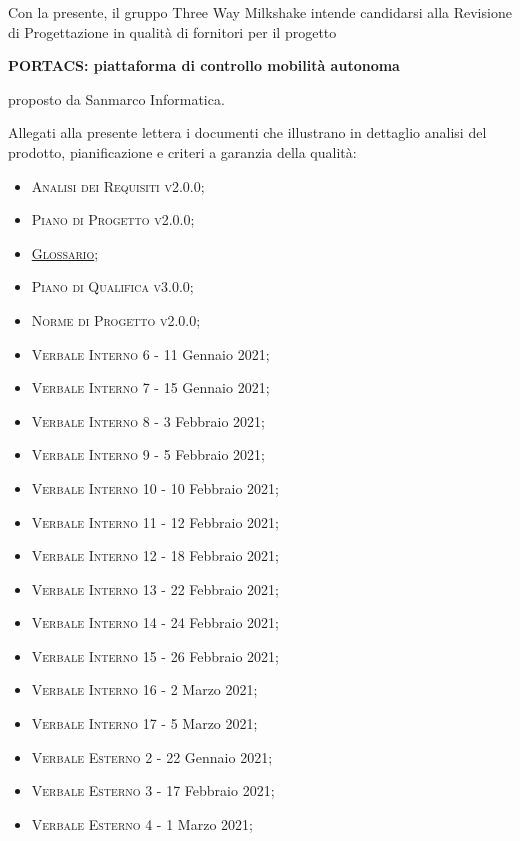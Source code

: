 \documentclass[10pt,stdletter,dateno,sigright]{newlfm}  %
\begin{document}
    \begin{newlfm}


        Con la presente, il gruppo Three Way Milkshake intende candidarsi alla Revisione di Progettazione in qualità di fornitori per il progetto
        \begin{center}
            \textbf{PORTACS: piattaforma di controllo mobilità autonoma}
        \end{center}
        proposto da Sanmarco Informatica.

        Allegati alla presente lettera i documenti che illustrano in dettaglio analisi del prodotto, pianificazione e criteri a garanzia della qualità:
	\begin{multicols}{2}
        \begin{itemize}
            \item \textsc{Analisi dei Requisiti v2.0.0;}
            \item \textsc{Piano di Progetto v2.0.0;}
            \item \textsc{\href{https://github.com/Three-Way-Milkshake/docs/wiki/Glossario}{Glossario};}
            \item \textsc{Piano di Qualifica v3.0.0;}
            \item \textsc{Norme di Progetto v2.0.0;}
            \item \textsc{Verbale Interno 6} - 11 Gennaio 2021;
            \item \textsc{Verbale Interno 7} - 15 Gennaio 2021;
            \item \textsc{Verbale Interno 8} - 3 Febbraio 2021;
            \item \textsc{Verbale Interno 9} - 5 Febbraio 2021;
            \item \textsc{Verbale Interno 10} - 10 Febbraio 2021;
            \item \textsc{Verbale Interno 11} - 12 Febbraio 2021;
            \item \textsc{Verbale Interno 12} - 18 Febbraio 2021;
            \item \textsc{Verbale Interno 13} - 22 Febbraio 2021;
            \item \textsc{Verbale Interno 14} - 24 Febbraio 2021;
            \item \textsc{Verbale Interno 15} - 26 Febbraio 2021;
            \item \textsc{Verbale Interno 16} - 2 Marzo 2021;
            \item \textsc{Verbale Interno 17} - 5 Marzo 2021;
            \item \textsc{Verbale Esterno 2} - 22 Gennaio 2021;
            \item \textsc{Verbale Esterno 3} - 17 Febbraio 2021;
            \item \textsc{Verbale Esterno 4} - 1 Marzo 2021;
        \end{itemize}
    \end{multicols}




\end{newlfm}
\end{document}
